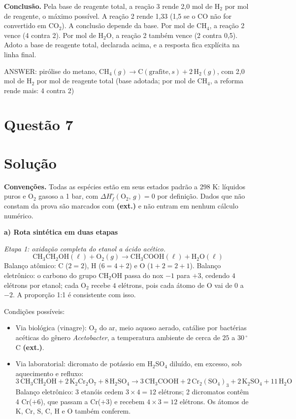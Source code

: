 \documentclass{article}%
\begin{document}
\textbf{Conclusão.} Pela base de reagente total, a reação 3 rende 2,0 mol de H$_2$ por mol de reagente, o máximo possível. A reação 2 rende 1,33 (1,5 se o CO não for convertido em CO$_2$). A conclusão depende da base. Por mol de CH$_4$, a reação 2 vence (4 contra 2). Por mol de H$_2$O, a reação 2 também vence (2 contra 0,5). Adoto a base de reagente total, declarada acima, e a resposta fica explícita na linha final.

ANSWER: pirólise do metano, $\mathrm{CH_4}(g) \rightarrow \mathrm{C}(\text{grafite}, s) + 2\,\mathrm{H_2}(g)$, com 2,0 mol de H$_2$ por mol de reagente total (base adotada; por mol de CH$_4$, a reforma rende mais: 4 contra 2)%
\newpage%
\section*{Questão 7}

\section*{Solução}

\textbf{Convenções.} Todas as espécies estão em seus estados padrão a 298 K: líquidos puros e O$_2$ gasoso a 1 bar, com $\Delta H^\circ_f(\text{O}_2,\,g)=0$ por definição. Dados que não constam da prova são marcados com \textbf{(ext.)} e não entram em nenhum cálculo numérico.

\textbf{a) Rota sintética em duas etapas}

\textit{Etapa 1: oxidação completa do etanol a ácido acético.}
\[
\text{CH}_3\text{CH}_2\text{OH}(\ell) + \text{O}_2(g) \longrightarrow \text{CH}_3\text{COOH}(\ell) + \text{H}_2\text{O}(\ell)
\]
Balanço atômico: C ($2=2$), H ($6=4+2$) e O ($1+2=2+1$). Balanço eletrônico: o carbono do grupo CH$_2$OH passa do nox $-1$ para $+3$, cedendo $4$ elétrons por etanol; cada O$_2$ recebe $4$ elétrons, pois cada átomo de O vai de $0$ a $-2$. A proporção 1:1 é consistente com isso.

Condições possíveis:
\begin{itemize}
\item Via biológica (vinagre): O$_2$ do ar, meio aquoso aerado, catálise por bactérias acéticas do gênero \textit{Acetobacter}, a temperatura ambiente de cerca de $25$ a $30\,^\circ$C \textbf{(ext.)}.
\item Via laboratorial: dicromato de potássio em H$_2$SO$_4$ diluído, em excesso, sob aquecimento e refluxo:
\[
3\,\text{CH}_3\text{CH}_2\text{OH} + 2\,\text{K}_2\text{Cr}_2\text{O}_7 + 8\,\text{H}_2\text{SO}_4 \longrightarrow 3\,\text{CH}_3\text{COOH} + 2\,\text{Cr}_2(\text{SO}_4)_3 + 2\,\text{K}_2\text{SO}_4 + 11\,\text{H}_2\text{O}
\]
Balanço eletrônico: 3 etanóis cedem $3\times 4=12$ elétrons; 2 dicromatos contêm 4 Cr($+6$), que passam a Cr($+3$) e recebem $4\times 3=12$ elétrons. Os átomos de K, Cr, S, C, H e O também conferem.
\end{itemize}
\end{document}
